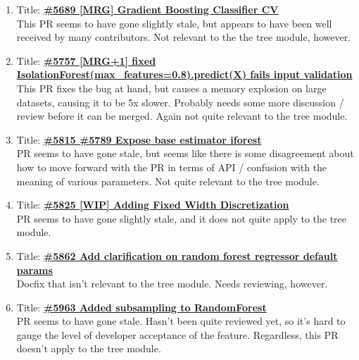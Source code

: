 \documentclass[12pt, oneside]{article}
\begin{document}
\begin{enumerate}
  \item
  Title:
  \textbf{\href{https://github.com/scikit-learn/scikit-learn/pull/5689}
    {\#5689 [MRG] Gradient Boosting Classifier CV}}\\
  This PR seems to have gone slightly stale, but appears to have been
  well received by many contributors. Not relevant to the the tree
  module, however.

  \item
  Title:
  \textbf{\href{https://github.com/scikit-learn/scikit-learn/pull/5757}
    {\#5757 [MRG+1] fixed IsolationForest(max\_features=0.8).predict(X)
    fails input validation}}\\
  This PR fixes the bug at hand, but causes a memory explosion on
  large datasets, causing it to be 5x slower. Probably needs some more
  discussion / review before it can be merged. Again not quite
  relevant to the tree module.

  \item
  Title:
  \textbf{\href{https://github.com/scikit-learn/scikit-learn/pull/5815}
    {\#5815 \#5789 Expose base estimator iforest}}\\
  PR seems to have gone stale, but seems like there is some
  disagreement about how to move forward with the PR in terms of API /
  confusion with the meaning of various parameters. Not quite relevant
  to the tree module.

  \item
  Title:
  \textbf{\href{https://github.com/scikit-learn/scikit-learn/pull/5825}
    {\#5825 [WIP] Adding Fixed Width Discretization}}\\
  PR seems to have gone slightly stale, and it does not quite apply to
  the tree module.

  \item
  Title:
  \textbf{\href{https://github.com/scikit-learn/scikit-learn/pull/5862}
    {\#5862 Add clarification on random forest regressor default params}}\\
  Docfix that isn't relevant to the tree module. Needs reviewing,
  however.

  \item
  Title:
  \textbf{\href{https://github.com/scikit-learn/scikit-learn/pull/5963}
    {\#5963 Added subsampling to RandomForest}}\\
  PR seems to have gone stale. Hasn't been quite reviewed yet, so it's
  hard to gauge the level of developer acceptance of the
  feature. Regardless, this PR doesn't apply to the tree module.


\end{enumerate}
\end{document}
